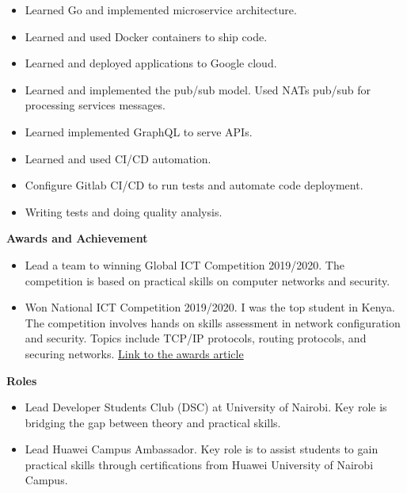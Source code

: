 \documentclass[a4paper]{article}
\begin{document}
\begin{itemize}[noitemsep]
    \item Learned Go and implemented microservice architecture.
    \item Learned and used Docker containers to ship code.
    \item Learned and deployed applications to Google cloud.
    \item Learned and implemented the pub/sub model. Used NATs pub/sub for processing services messages.
    \item Learned implemented GraphQL to serve APIs.
    \item Learned and used CI/CD automation.
    \item Configure Gitlab CI/CD to run tests and automate code deployment.
    \item Writing tests and doing quality analysis.
\end{itemize}

\begin{center}
    {\Large \textbf{Awards and Achievement}}
\end{center}

\begin{itemize}[noitemsep]
    \item Lead a team to winning Global ICT Competition 2019/2020. The competition is based on practical skills on computer networks and security.
    \item Won National ICT Competition 2019/2020. I was the top student in Kenya. The competition involves hands on skills assessment in network configuration and security. Topics include TCP/IP protocols, routing protocols, and securing networks. \href{https://www.uonbi.ac.ke/news/uon-student-wins-huawei-network-cloud-track-award}{Link to the awards article}
\end{itemize}

\begin{center}
    {\Large \textbf{Roles}}
\end{center}

\begin{itemize}[noitemsep]
    \item Lead Developer Students Club (DSC) at University of Nairobi. Key role is bridging the gap between theory and practical skills.
    \item Lead Huawei Campus Ambassador. Key role is to assist students to gain practical skills through certifications from Huawei University of Nairobi Campus.
\end{itemize}
\end{document}
